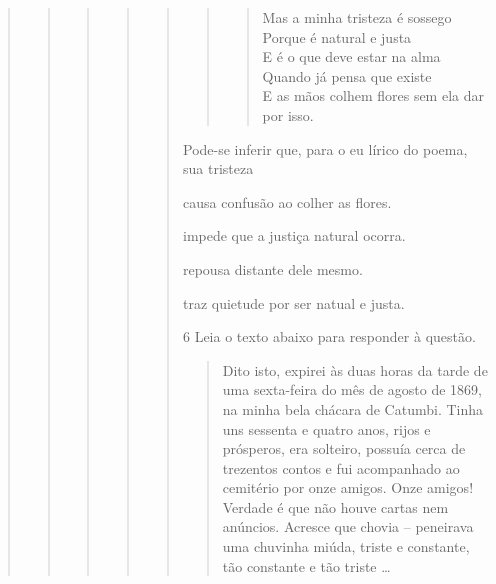 \begin{quote}
\begin{quote}
\begin{quote}
\begin{quote}
\begin{quote}
\begin{quote}
\begin{verse}
Mas a minha tristeza é sossego \\
Porque é natural e justa \\
E é o que deve estar na alma \\
Quando já pensa que existe \\
E as mãos colhem flores sem ela dar por isso.

\end{verse}
\end{quote}


Pode-se inferir que, para o eu lírico do poema, sua tristeza

\begin{escolha}

    \item causa confusão ao colher as flores.

    \item impede que a justiça natural ocorra.

    \item repousa distante dele mesmo. 

    \item traz quietude por ser natual e justa. 

\end{escolha}


\num{6} Leia o texto abaixo para responder à questão. 


\begin{quote}

Dito isto, expirei às duas horas da tarde de uma
sexta-feira do mês de agosto de 1869, na minha bela
chácara de Catumbi. Tinha uns sessenta e quatro anos,
rijos e prósperos, era solteiro, possuía cerca de trezentos
contos e fui acompanhado ao cemitério por onze amigos.
Onze amigos! Verdade é que não houve cartas nem
anúncios. Acresce que chovia -- peneirava uma chuvinha
miúda, triste e constante, tão constante e tão triste \ldots{}


\end{quote}
\end{quote}
\end{quote}
\end{quote}
\end{quote}
\end{quote}
